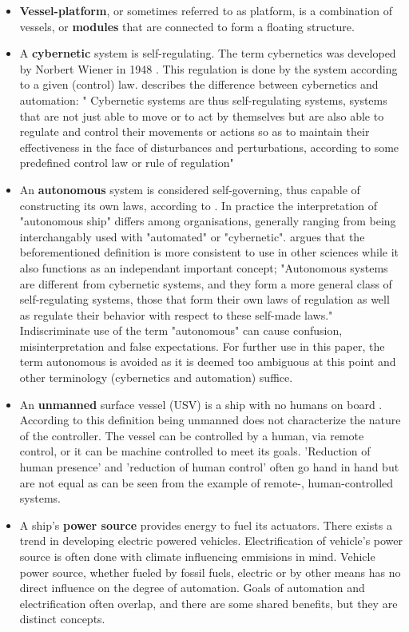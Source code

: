 \begin{itemize}
	\item \textbf{Vessel-platform}, or sometimes referred to as platform, is a combination of vessels, or  \textbf{modules} that are connected to form a floating structure.
	
	\item A \textbf{cybernetic} system is self-regulating. The term cybernetics was developed by Norbert Wiener in 1948 \citet{norbert1948or}. This regulation is done by the system according to a given (control) law. \citet {smithers1997autonomy} describes the difference between cybernetics and automation: " Cybernetic systems are thus self-regulating systems, systems that are not just able to move or to act by themselves but are also able to regulate and control their movements or actions so as to maintain their effectiveness in the face of disturbances and perturbations, according to some predefined control law or rule of regulation" 
	
	\item An \textbf{autonomous} system is considered self-governing, thus capable of constructing its own laws, according to \citet{smithers1997autonomy}. In practice the interpretation of "autonomous ship" differs among organisations, generally ranging from being interchangably used with "automated" or "cybernetic".  \citet{smithers1997autonomy} argues that the beforementioned definition is more consistent to use in other sciences while it also functions as an independant important concept; "Autonomous systems are different from cybernetic systems, and they form a more general class of self-regulating systems, those that form their own laws of regulation as well as regulate their behavior with respect to these self-made laws." Indiscriminate use of the term "autonomous" can cause confusion, misinterpretation and false expectations.  For further use in this paper, the term autonomous is avoided as it is deemed too ambiguous at this point and other terminology (cybernetics and automation) suffice.
	
	\item An \textbf{unmanned} surface vessel (USV) is a ship with no humans on board \cite{IMO103ISORegulatoryScopingExMass}. According to this definition being unmanned does not characterize the nature of the controller. The vessel can be controlled by a human, via remote control, or it can be machine controlled to meet its goals. 'Reduction of human presence' and 'reduction of human control' often go hand in hand \cite{heo2017analysis} but are not equal as can be seen from the example of remote-, human-controlled systems. 
	
	\item A ship's \textbf{power source} provides energy to fuel its actuators. There exists a trend in developing electric powered vehicles. Electrification of vehicle's power source is often done with climate influencing emmisions in mind. Vehicle power source, whether fueled by fossil fuels, electric or by other means has no direct influence on the degree of automation. Goals of automation and electrification often overlap, and there are some shared benefits, but they are distinct concepts. 
\end{itemize}

